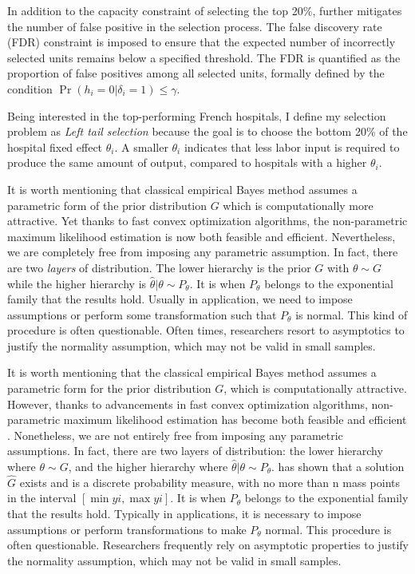 \documentclass[12pt]{article}
\begin{document}
In addition to the capacity constraint of selecting the top 20\%,
\citet{gu2023invidious} further mitigates the number of false positive in the
selection process. The false discovery rate (FDR) constraint is imposed to
ensure that the expected number of incorrectly selected units remains below a
specified threshold. The FDR is quantified as the proportion of false positives
among all selected units, formally defined by the condition
$\Pr(h_i=0|\delta_i=1) \leq \gamma$.

Being interested in the top-performing French hospitals, I define my selection
problem as \textit{Left tail selection} because the goal is to choose the
bottom 20\% of the hospital fixed effect $\theta_i$. A smaller $\theta_i$
indicates that less labor input is required to produce the same amount of
output, compared to hospitals with a higher $\theta_i$.

It is worth mentioning that classical empirical Bayes method assumes a
parametric form of the prior distribution $G$ which is computationally more
attractive. Yet thanks to fast convex optimization algorithms, the
non-parametric maximum likelihood estimation is now both feasible and
efficient. Nevertheless, we are completely free from imposing any parametric
assumption. In fact, there are two \textit{layers} of distribution. The lower
hierarchy is the prior $G$ with $\theta\sim G$ while the higher hierarchy is
$\hat{\theta}|\theta \sim P_{\theta}$. It is when $P_{\theta}$ belongs to the
exponential family that the \citet{lindsay1995mixture} results hold. Usually in
application, we need to impose assumptions or perform some transformation such
that $P_{\theta}$ is normal. This kind of procedure is often questionable.
Often times, researchers resort to asymptotics to justify the normality
assumption, which may not be valid in small samples.

It is worth mentioning that the classical empirical Bayes method assumes a
parametric form for the prior distribution $G$, which is computationally
attractive. However, thanks to advancements in fast convex optimization
algorithms, non-parametric maximum likelihood estimation
\citep{kiefer1956consistency} has become both feasible and efficient
\citep{koenker2014convex,andersen2010mosek}. Nonetheless, we are not entirely
free from imposing any parametric assumptions. In fact, there are two layers of
distribution: the lower hierarchy where $\theta \sim G$, and the higher
hierarchy where $\hat{\theta} | \theta \sim P_{\theta}$.
\citet{lindsay1995mixture} has shown that a solution $\hat{G}$ exists and is a
discrete probability measure, with no more than n mass points in the interval
$[\min yi , \max yi ]$. It is when $P_{\theta}$ belongs to the exponential
family that the \citet{lindsay1995mixture} results hold. Typically in
applications, it is necessary to impose assumptions or perform transformations
to make $P_{\theta}$ normal. This procedure is often questionable. Researchers
frequently rely on asymptotic properties to justify the normality assumption,
which may not be valid in small samples.
\end{document}
